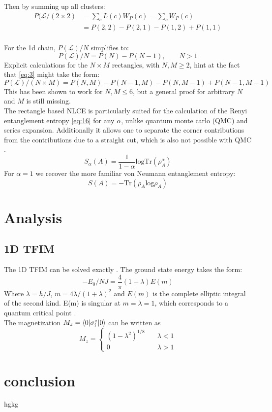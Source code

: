 \documentclass{article}
\begin{document}
Then by summing up all clusters:
\begin{align*}
\label{eq:17}
P(\mathcal{L}/(2 \times 2) &=\sum\limits_c L(c) W_P(c) = \sum\limits_c
                      W_P(c)\\
 &= P(2,2) - P(2,1) - P(1,2) + P(1,1)
\end{align*}
\\
For the 1d chain, $P(\mathcal{L})/N$ simplifies to:
\begin{equation}
\label{eq:20}
P(\mathcal{L})/N = P(N) - P(N-1), \qquad N>1
\end{equation}
Explicit calculations for the $N \times M$ rectangles, with $N,M \geq 2$, hint at the fact that
\eqref{eq:3} might take the form:
\begin{equation}
\label{eq:21}
P(\mathcal{L})/(N \times M) = P(N,M) - P(N-1,M) - P(N,M-1) +
P(N-1,M-1)
\end{equation}
This has been shown to work for $N,M \leq 6$, but a general proof for
arbitrary $N$ and $M$ is still missing.\\
The rectangle based NLCE is particularly suited for the calculation of the
Renyi entanglement entropy \eqref{eq:16} for any $\alpha$, unlike
quantum monte carlo (QMC) and series expansion. Additionally it allows one
to separate the corner contributions from the contributions due to a
straight cut, which is also not possible with QMC \cite{Kallin,Melko}.\\
\begin{equation}
\label{eq:16}
S_{\alpha}(A) = \frac{1}{1-\alpha} \text{logTr}(\rho^{\alpha}_A)
\end{equation}
For $\alpha = 1$ we recover the more familiar von Neumann entanglement
entropy:
\begin{equation}
\label{eq:27}
S(A) = -\text{Tr}(\rho_A \text{log} \rho_A)
\end{equation}

\section{Analysis}
\subsection{1D TFIM}
The 1D TFIM can be solved exactly \cite{Pfeuty}. The ground state
energy takes the form:
\begin{equation}
\label{eq:22}
-E_0/NJ = \frac{4}{\pi} (1+ \lambda)E(m)
\end{equation}
Where $\lambda = h/J$, $m= 4\lambda /(1+\lambda)^2$ and $E(m)$ is the
complete elliptic integral of the second kind. E(m) is singular at $m
= \lambda = 1$, which corresponds to a quantum critical point \cite{Series}.\\
The magnetization $M_z = \braket{0|\sigma_i^z|0}$ can be written as
\begin{equation}
\label{eq:13}
M_z = 
\begin{cases} (1-\lambda^2)^{1/8} & \quad \lambda <1\\
0 & \quad \lambda >1
\end{cases}
\end{equation}



\section{conclusion}
hgkg 

\medskip




\end{document}

